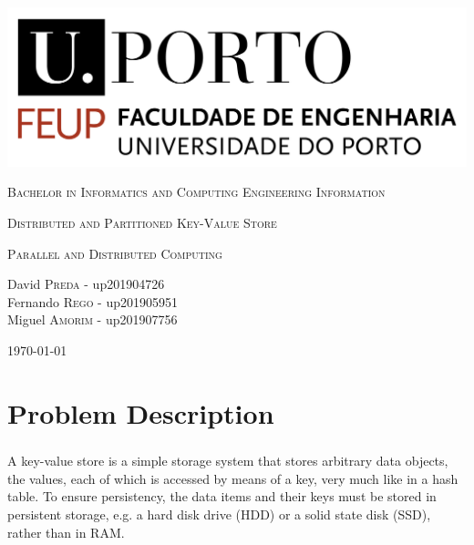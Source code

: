 \documentclass{report}
\begin{document}
	\begin{titlepage}
		\centering
		\includegraphics[scale=0.35]{logo_feup.png}\linebreak
		
		\vspace{1cm}
		
		{\scshape \large Bachelor in Informatics and Computing Engineering
		Information}
		
		\vspace {1cm}
		
		{\scshape\Huge Distributed and Partitioned Key-Value Store \par}
		
		\vfill
		
		{\scshape \large Parallel and Distributed Computing}
		
		\vfill
		
		\Large David \textsc{Preda} - up201904726 \\ Fernando
		\textsc{Rego} - up201905951 \\ Miguel \textsc{Amorim} - up201907756
		
		\vspace{1cm}
		
		\today
		
	\end{titlepage}

	\tableofcontents
	
	\chapter{Problem Description}
			\paragraph{} A key-value store is a simple storage system that stores
			arbitrary data objects, the values, each of which is accessed by means
			of a key, very much like in a hash table. To ensure persistency, the data
			items and their keys must be stored in persistent storage, e.g. a hard
			disk drive (HDD) or a solid state disk (SSD), rather than in RAM.
			
\end{document}
